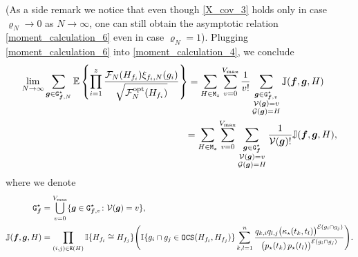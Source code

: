 \documentclass[11pt,reqno]{amsart}
\numberwithin{equation}{section}
\newcommand{\E}[1]{\mathbb{E}\left\{ #1\right\}}
\newcommand{\kb}[1]{\boldsymbol{#1}}
\newcommand{\vk}[1]{\kb{#1}}
\begin{document}
(As a side remark we notice that even though \eqref{X_cov_3} holds only in case $\varrho_N\to 0$ as $N\to\infty$, one can still obtain the asymptotic relation \eqref{moment_calculation_6} even in case $\varrho_N=1$).
Plugging \eqref{moment_calculation_6} into \eqref{moment_calculation_4}, {we conclude} 
\begin{align}
    {\lim_{N\to\infty}}\sum_{\vk g\in{\tt G}^{\star}_{\vk f,N}}\E{\prod_{i=1}^{z}\frac{\mathcal{F}_{{N}}({H}_{f_i})\xi_{f_i,{N}}(g_i)}{\sqrt{\mathcal{F}^{\rm opt}_N({H}_{f_i})}}}
    &=\sum_{{H}\in{\tt M}_z}\sum_{v=0}^{V_{\max}}\frac{1}{v!}\sum_{\substack{\vk g\in{\tt G}^{\star}_{\vk f,v}\\
     \mathcal{V}\left(\vk g\right) = v \\ \mathcal{G}(\vk g)={H}}}{\mathbb J}({\vk f},{\vk g},H)\notag\\
     &{=\sum_{{H}\in{\tt M}_z}\sum_{v=0}^{V_{\max}}\sum_{\substack{\vk g\in{\tt G}^{\star}_{\vk f}\\
     \mathcal{V}\left(\vk g\right) = v \\ \mathcal{G}(\vk g)={H}}}\frac{1}{\mathcal{V}(\vk g)!}{\mathbb J}({\vk f},{\vk g},H)},\label{moment_calculation_6.5}
\end{align}
where we denote 
\begin{align*}
    {\tt G}_{\vk f}^{\star} &= \bigcup_{v=0}^{V_{\max}}\{\vk g\in{\tt G}_{\vk f, v}^{\star}\colon \mathcal{V}(\vk g) = v\},\\
    {\mathbb J}({\vk f},{\vk g},H)&=\prod_{(i,j)\in{\tt E}({H})}\mathbb{I}\{{H}_{f_i}\cong {H}_{f_j}\}\Bigg(\mathbb{I}\{g_i\cap g_j\in{\tt OCS}({H}_{f_i},{H}_{f_j})\}\sum_{k,l=1}^{n}\frac{q_{k,i}q_{l,j}\bigl(\kappa_{\star}(t_k,t_l)\bigr)^{\mathcal{E}(g_i\cap g_j)}}{\bigl(p_{\star}(t_k)\,p_{\star}(t_l)\bigr)^{\mathcal{E}(g_i\cap g_j)}}\Bigg).
\end{align*}
\end{document}
